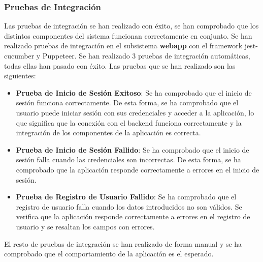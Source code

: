 \subsubsection{Pruebas de Integración}
Las pruebas de integración se han realizado con éxito, se han comprobado que los distintos componentes del sistema funcionan correctamente en conjunto.
Se han realizado pruebas de integración en el subsistema \textbf{webapp} con el framework jest-cucumber y Puppeteer.
Se han realizado 3 pruebas de integración automáticas, todas ellas han pasado con éxito.
Las pruebas que se han realizado son las siguientes:
\begin{itemize}
    \item \textbf{Prueba de Inicio de Sesión Exitoso}: Se ha comprobado que el inicio de sesión funciona correctamente. De esta forma, se ha comprobado que el usuario puede iniciar sesión con sus credenciales y acceder a la aplicación, 
    lo que significa que la conexión con el backend funciona correctamente y la integración de los componentes de la aplicación es correcta.
    \item \textbf{Prueba de Inicio de Sesión Fallido}: Se ha comprobado que el inicio de sesión falla cuando las credenciales son incorrectas. De esta forma, se ha comprobado que la aplicación responde correctamente a errores en el inicio de sesión.
     \item \textbf{Prueba de Registro de Usuario Fallido}: Se ha comprobado que el registro de usuario falla cuando los datos introducidos no son válidos. 
     Se verifica que la aplicación responde correctamente a errores en el registro de usuario y se resaltan los campos con errores.
\end{itemize}

El resto de pruebas de integración se han realizado de forma manual y se ha comprobado que el comportamiento de la aplicación es el esperado.

